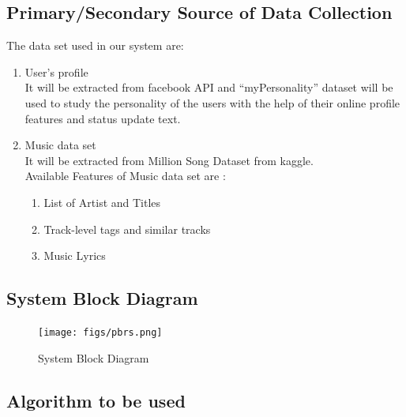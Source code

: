\documentclass[a4paper,12pt]{article}
\begin{document}
\subsection{Primary/Secondary Source of Data Collection}
The data set used in our system are:
\begin{enumerate}
\item User's profile\\
  It will be extracted from facebook API and ``myPersonality'' dataset will be used to study the personality of the users with the help of their online profile features and status update text.
\item Music data set\\
  It will be extracted from Million Song Dataset from kaggle. \\
  Available Features of Music data set are :
  \begin{enumerate}
  \item List of Artist and Titles
  \item Track-level tags and similar tracks
  \item Music Lyrics
  \end{enumerate}
\end{enumerate}

\subsection{System Block Diagram}
\begin{figure}[ht!]
  \centering
  \texttt{[image: figs/pbrs.png]}
  \caption{System Block Diagram \label{fig:pbrs}}
\end{figure}

\subsection{Algorithm to be used}
\end{document}
